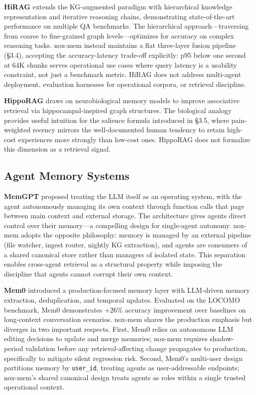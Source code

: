 \documentclass{article}
\begin{document}
\textbf{HiRAG} \cite{huang2025hirag} extends the KG-augmented paradigm with hierarchical
knowledge representation and iterative reasoning chains, demonstrating state-of-the-art
performance on multiple QA benchmarks. The hierarchical approach---traversing from coarse to
fine-grained graph levels---optimizes for accuracy on complex reasoning tasks. nox-mem
instead maintains a flat three-layer fusion pipeline (\S3.4), accepting the
accuracy-latency trade-off explicitly: p95 below one second at 64K chunks serves
operational use cases where query latency is a usability constraint, not just a benchmark
metric. HiRAG does not address multi-agent deployment, evaluation harnesses for operational
corpora, or retrieval discipline.

\textbf{HippoRAG} \cite{guo2024hipporag} draws on neurobiological memory models to improve
associative retrieval via hippocampal-inspired graph structures. The biological analogy
provides useful intuition for the salience formula introduced in \S3.5, where pain-weighted
recency mirrors the well-documented human tendency to retain high-cost experiences more
strongly than low-cost ones. HippoRAG does not formalize this dimension as a retrieval
signal.

\subsection{Agent Memory Systems}

\textbf{MemGPT} \cite{packer2023memgpt} proposed treating the LLM itself as an operating
system, with the agent autonomously managing its own context through function calls that
page between main context and external storage. The architecture gives agents direct
control over their memory---a compelling design for single-agent autonomy. nox-mem adopts
the opposite philosophy: memory is managed by an external pipeline (file watcher, ingest
router, nightly KG extraction), and agents are consumers of a shared canonical store rather
than managers of isolated state. This separation enables cross-agent retrieval as a
structural property while imposing the discipline that agents cannot corrupt their own
context.

\textbf{Mem0} \cite{chhikara2025mem0} introduced a production-focused memory layer with
LLM-driven memory extraction, deduplication, and temporal updates. Evaluated on the LOCOMO
benchmark, Mem0 demonstrates +26\% accuracy improvement over baselines on long-context
conversation scenarios. nox-mem shares the production emphasis but diverges in two
important respects. First, Mem0 relies on autonomous LLM editing decisions to update and
merge memories; nox-mem requires shadow-period validation before any retrieval-affecting
change propagates to production, specifically to mitigate silent regression risk. Second,
Mem0's multi-user design partitions memory by \texttt{user\_id}, treating agents as
user-addressable endpoints; nox-mem's shared canonical design treats agents as roles within
a single trusted operational context.
\end{document}
